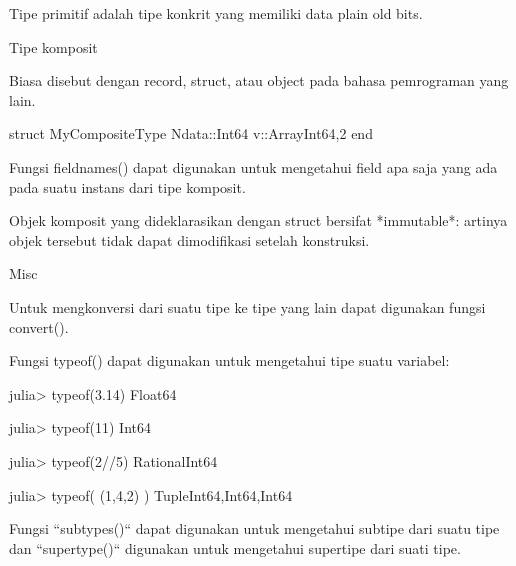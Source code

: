 Tipe primitif adalah tipe konkrit yang memiliki data plain old bits.

Tipe komposit

Biasa disebut dengan record, struct, atau object pada bahasa pemrograman yang
lain.

\begin{juliacode}
struct MyCompositeType
  Ndata::Int64
  v::Array{Int64,2}
end
\end{juliacode}

Fungsi fieldnames() dapat digunakan untuk mengetahui field apa saja
yang ada pada suatu instans dari tipe komposit.

Objek komposit yang dideklarasikan dengan struct bersifat *immutable*: artinya
objek tersebut tidak dapat dimodifikasi setelah konstruksi.


Misc

Untuk mengkonversi dari suatu tipe ke tipe yang lain dapat digunakan
fungsi convert().

Fungsi typeof() dapat digunakan untuk mengetahui tipe suatu variabel:

\begin{jlconcode}
julia> typeof(3.14)
Float64

julia> typeof(11)
Int64

julia> typeof(2//5)
Rational{Int64}

julia> typeof( (1,4,2) )
Tuple{Int64,Int64,Int64}
\end{jlconcode}

Fungsi ``subtypes()`` dapat digunakan untuk mengetahui subtipe dari suatu tipe
dan ``supertype()`` digunakan untuk mengetahui supertipe dari suati tipe.
